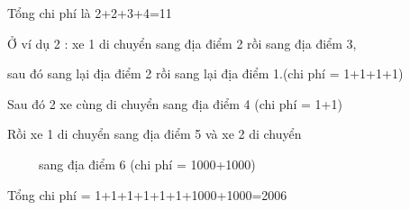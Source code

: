 Tổng chi phí là 2+2+3+4=11


Ở ví dụ 2 : xe 1 di chuyển sang địa điểm 2 rồi sang địa điểm 3,


sau đó sang lại địa điểm 2 rồi sang lại địa điểm 1.(chi phí = 1+1+1+1)


Sau đó 2 xe cùng di chuyển sang địa điểm 4 (chi phí = 1+1)


Rồi xe 1 di chuyển sang địa điểm 5 và xe 2 di chuyển


     sang địa điểm 6 (chi phí = 1000+1000)


Tổng chi phí = 1+1+1+1+1+1+1000+1000=2006





 

 
